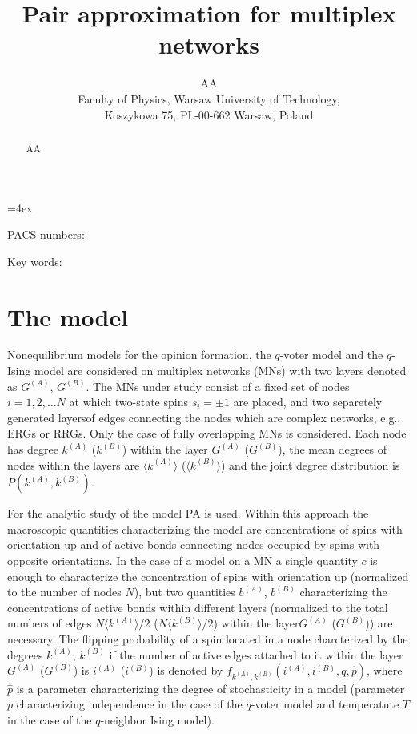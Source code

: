 \documentclass[11pt]{article}
\begin{document}
  
  
\title{{\bf Pair approximation for multiplex networks}}  
\author{AA\\  
Faculty of Physics, Warsaw University of Technology, \\
Koszykowa 75, PL-00-662 Warsaw, Poland}  
  
\baselineskip=4ex   
\maketitle  
\begin{abstract}  
AA
\end{abstract}  
  
PACS numbers: 

Key words: 
  

\section{The model}

Nonequilibrium models for the opinion formation, the $q$-voter model and the $q$-Ising model are considered on
multiplex networks (MNs) with two layers denoted as $G^{(A)}$, $G^{(B)}$. 
The MNs under study consist of a fixed set of nodes $i=1,2,\ldots N$
at which two-state spins $s_{i}=\pm 1$ are placed, and two separetely generated layersof edges connecting the 
nodes which are complex networks, e.g., ERGs or RRGs. Only the case of fully overlapping MNs is considered.
Each node has degree $k^{(A)}$ ($k^{(B)}$) within the layer $G^{(A)}$ ($G^{(B)}$),
the mean degrees of nodes within the layers are $\langle k^{(A)}\rangle$ ($\langle k^{(B)}\rangle$)
and the joint degree distribution is $P\left( k^{(A)}, k^{(B)}\right)$.

For the analytic study of the model PA is used.
Within this approach the macroscopic quantities characterizing the model are concentrations of spins with orientation
up and of active bonds connecting nodes occupied by spins with opposite orientations. In the case of a model
on a MN a single quantity $c$ is enough to characterize the concentration of spins with orientation up 
(normalized to the number of nodes $N$), but two quantities $b^{(A)}$, $b^{(B)}$ 
characterizing the concentrations of active bonds within different layers 
(normalized to the total numbers of edges $N\langle k^{(A)}\rangle/2$ ($N\langle k^{(B)}\rangle/2$)
within the layer$G^{(A)}$ ($G^{(B)}$)) are necessary. The flipping probability of a spin located in a node
charcterized by the degrees $k^{(A)}$, $k^{(B)}$ if the number of active edges attached to it within the layer 
$G^{(A)}$ ($G^{(B)}$) is $i^{(A)}$ ($i^{(B)}$) is denoted by
$f_{k^{(A)},k^{(B)}}\left( i^{(A)},i^{(B)},q,\hat{p}\right)$,
where $\hat{p}$ is a parameter characterizing the degree of stochasticity in a model
(parameter $p$ characterizing independence in the case of the $q$-voter model and temperatute $T$ in the
case of the $q$-neighbor Ising model).
\end{document}
